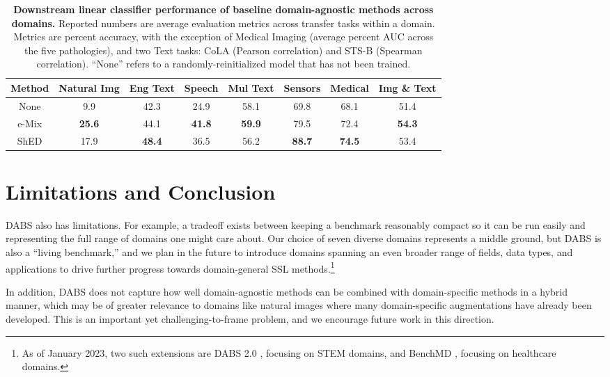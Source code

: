 \documentclass{article}
\begin{document}
\begin{table}
\centering
\begin{tabular}{cccccccc}
\toprule
Method & Natural Img & Eng Text & Speech & Mul Text  & Sensors & Medical & Img \& Text \\
\midrule
None   & 9.9 & 42.3 & 24.9 & 58.1 & 69.8 & 68.1 & 51.4  \\
e-Mix  & \textbf{25.6} & 44.1 & \textbf{41.8} &	\textbf{59.9} & 79.5 & 72.4 & \textbf{54.3}  \\
ShED   & 17.9 & \textbf{48.4} & 36.5 & 56.2 & \textbf{88.7} & \textbf{74.5} & 53.4  \\
\bottomrule
\end{tabular}
\vspace{.2cm}
\caption{\textbf{Downstream linear classifier performance of baseline domain-agnostic methods across domains.} Reported numbers are average evaluation metrics across transfer tasks within a domain. Metrics are percent accuracy, with the exception of Medical Imaging (average percent AUC across the five pathologies), and two Text tasks: CoLA (Pearson correlation) and STS-B (Spearman correlation). ``None'' refers to a randomly-reinitialized model that has not been trained.}
\label{table:results}
\end{table}

\section{Limitations and Conclusion}
\label{sec:conclusion}

DABS also has limitations. For example, a tradeoff exists between keeping a benchmark reasonably compact so it can be run easily and representing the full range of domains one might care about. Our choice of seven diverse domains represents a middle ground, but DABS is also a ``living benchmark,'' and we plan in the future to introduce domains spanning an even broader range of fields, data types, and applications to drive further progress towards domain-general SSL methods.\footnote{As of January 2023, two such extensions are DABS 2.0 \citep{tamkin2022dabs}, focusing on STEM domains, and BenchMD \citep{BenchMD}, focusing on healthcare domains.} 

In addition, DABS does not capture how well domain-agnostic methods can be combined with domain-specific methods in a hybrid manner, which may be of greater relevance to domains like natural images where many domain-specific augmentations have already been developed. This is an important yet challenging-to-frame problem, and we encourage future work in this direction.
\end{document}
